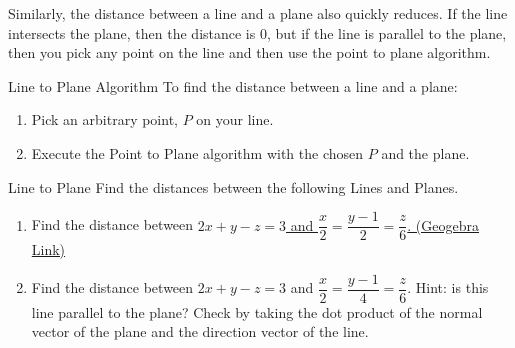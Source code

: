 Similarly, the distance between a line and a plane also quickly reduces. If the line intersects the plane, then the distance is 0, but if the line is parallel to the plane, then you pick any point on the line and then use the point to plane algorithm.

\begin{claim}{Line to Plane Algorithm}
To find the distance between a line and a plane:
\vspace{1em}
\begin{enumerate}
\item Pick an arbitrary point, $P$ on your line.
\vspace{1em}
\item Execute the Point to Plane algorithm with the chosen $P$ and the plane.
\end{enumerate}
\end{claim}

\begin{exercise}{Line to Plane}
Find the distances between the following Lines and Planes.
\vspace{1em}
\begin{enumerate}
\item Find the distance between \href{https://www.geogebra.org/3d/guykkgyr}{$2x+y-z=3$ and $\dfrac{x}{2}=\dfrac{y-1}{2}=\dfrac{z}{6}$. (Geogebra Link)}
\vspace{1em}
\item Find the distance between $2x+y-z=3$ and $\dfrac{x}{2}=\dfrac{y-1}{4}=\dfrac{z}{6}$. Hint: is this line parallel to the plane? Check by taking the dot product of the normal vector of the plane and the direction vector of the line.
\end{enumerate}
\end{exercise}